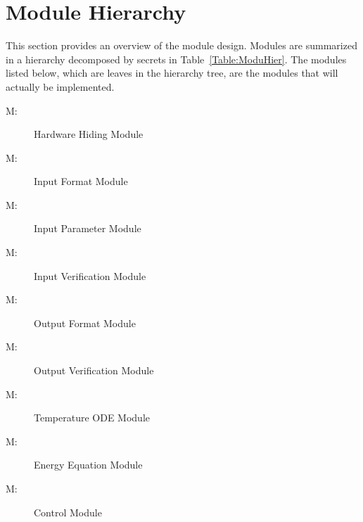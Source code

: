 \documentclass[12pt]{article}
\newcounter{modnum}
\newcommand{\mthemodnum}{M\themodnum}
\begin{document}
\section{Module Hierarchy}
\label{Sec:ModuHier}
This section provides an overview of the module design. Modules are summarized in a hierarchy decomposed by secrets in Table~\ref{Table:ModuHier}. The modules listed below, which are leaves in the hierarchy tree, are the modules that will actually be implemented.
\begin{description}
\item[\mthemodnum\label{MhwHiding}:]Hardware Hiding Module
\end{description}
\begin{description}
\item[\mthemodnum\label{MmodInputFormat}:]Input Format Module
\end{description}
\begin{description}
\item[\mthemodnum\label{MmodInputParam}:]Input Parameter Module
\end{description}
\begin{description}
\item[\mthemodnum\label{MmodInputVerif}:]Input Verification Module
\end{description}
\begin{description}
\item[\mthemodnum\label{Mmodoutputfdesc}:]Output Format Module
\end{description}
\begin{description}
\item[\mthemodnum\label{Mmodoutputvdesc}:]Output Verification Module
\end{description}
\begin{description}
\item[\mthemodnum\label{Mmodtempdesc}:]Temperature ODE Module
\end{description}
\begin{description}
\item[\mthemodnum\label{Mmodenerdesc}:]Energy Equation Module
\end{description}
\begin{description}
\item[\mthemodnum\label{MmodControl}:]Control Module
\end{description}
\end{document}
